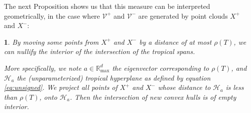 \documentclass[oneside,UKenglish,a4paper]{amsart}
\numberwithin{equation}{section}
\numberwithin{figure}{section}
\theoremstyle{plain}
\theoremstyle{definition}
\theoremstyle{plain}
\newtheorem{prop}[thm]{\protect\propositionname}
\theoremstyle{remark}
\theoremstyle{plain}
\theoremstyle{definition}
\theoremstyle{definition}
\providecommand{\propositionname}{Proposition}
\begin{document}
The next Proposition shows
us that this measure can be interpreted geometrically, in the case
where $\mathcal{V}^{+}$ and $\mathcal{V}^{-}$ are generated by point
clouds $X^{+}$ and $X^{-}$:
\begin{prop}\label{prop:BinarySoftMargin}
By moving some points from $X^{+}$ and $X^{-}$ by a distance of
at most $\rho(T)$, we can nullify the interior of the intersection
of the tropical spans.

More specifically, we note $a\in\mathbb{R}_{\max}^{d}$ the eigenvector
corresponding to $\rho(T)$, and $\mathcal{H}_a$ the (unparameterized) tropical hyperplane as defined by equation \ref{eq:unsigned}. We project all points of $X^{+}$ and
$X^{-}$ whose distance to $\mathcal{H}_{a}$ is less than $\rho(T)$,
onto $\mathcal{H}_{a}$. Then the intersection of new convex hulls
is of empty interior.
\end{prop}
\end{document}
